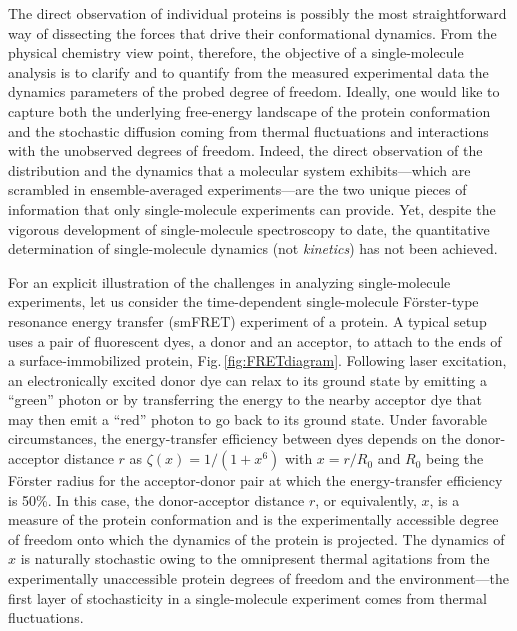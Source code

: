 \documentclass[journal=jpcbfk,manuscript=article,layout=twocolumn,articletitle=true]{achemso}
\begin{document}
The direct observation of individual proteins is possibly the most straightforward way of dissecting the forces that drive their conformational dynamics. From the physical chemistry view point, therefore, the objective of a single-molecule analysis is to clarify and to quantify from the measured experimental data the dynamics parameters of the probed degree of freedom. Ideally, one would like to capture both the underlying free-energy landscape of the protein conformation and the stochastic diffusion coming from thermal fluctuations and interactions with the unobserved degrees of freedom. Indeed, the direct observation of the distribution and the dynamics that a molecular system exhibits---which are scrambled in ensemble-averaged experiments---are the two unique pieces of information that only single-molecule experiments can provide.\cite{Moerner_Orrit_Science_1999,Weiss_Science_1999} Yet, despite the vigorous development of single-molecule spectroscopy to date,\cite{Yang_book_all_2008,SMColdSpring,Yang_Book_All_2012} the quantitative determination of single-molecule dynamics (not {\it kinetics}) has not been achieved.

For an explicit illustration of the challenges in analyzing single-molecule experiments, let us consider the time-dependent single-molecule F\"orster-type resonance energy transfer (smFRET) experiment of a protein.\cite{Michalet:2006kf,Seidel_review_2010,Tan_Yang_2011} A typical setup uses a pair of fluorescent dyes, a donor and an acceptor, to attach to the ends of a surface-immobilized protein, Fig.\,\ref{fig:FRETdiagram}. Following laser excitation, an electronically excited donor dye can relax to its ground state by emitting a ``green'' photon or by transferring the energy to the nearby acceptor dye that may then emit a ``red'' photon to go back to its ground state. Under favorable circumstances,\cite{Yang:2010gh} the energy-transfer efficiency between dyes depends on the donor-acceptor distance $r$ as $\zeta(x) = 1/(1+ x^6 )$ with $x = r / R_0$ and $R_0$ being the F\"{o}rster radius for the acceptor-donor pair at which the energy-transfer efficiency is 50\%. In this case, the donor-acceptor distance $r$, or equivalently, $x$, is a measure of the protein conformation and is the experimentally accessible degree of freedom onto which the dynamics of the protein is projected. The dynamics of $x$ is naturally stochastic owing to the omnipresent thermal agitations from the experimentally unaccessible protein degrees of freedom and the environment---the first layer of stochasticity in a single-molecule experiment comes from thermal fluctuations. 
\end{document}
